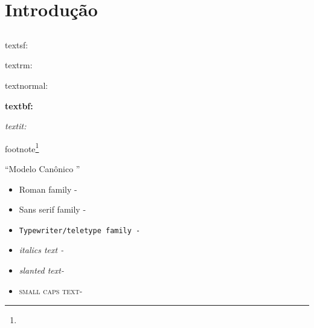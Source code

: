 

\cleardoublepage
{} %



\chapter[Introdução]{Introdução \showfont}






\newpage


\section[Some encoding tests]{\showfont}
\subsection{\showfont}
\subsubsection{\showfont}
\subsubsubsection{\showfont}


\textsf{textsf: \showfont}

\textrm{textrm: \showfont}

\textnormal{textnormal: \showfont}

\textbf{textbf: \showfont}

\textit{textit: \showfont}

footnote\footnote{\showfont}


``Modelo Canônico \showfont''

\begin{itemize}
	\item \textrm{Roman family - \showfont }
	\item \textsf{Sans serif family - \showfont}
	\item \texttt{Typewriter/teletype family - \showfont}
	\item \textit{italics text - \showfont}
	\item \textsl{slanted text- \showfont}
	\item \textsc{small caps text- \showfont}
\end{itemize}




